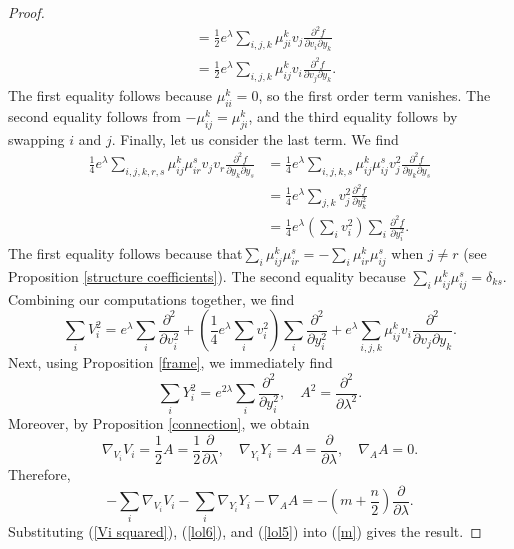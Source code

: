 \documentclass{amsart}
\theoremstyle{plain}
\theoremstyle{definition}
\theoremstyle{remark}
\begin{document}
\begin{proof}
\begin{align*}
			&= \frac12 e^\lambda \sum_{i,j,k} \mu_{ji}^k v_j \frac{\partial^2 f}{\partial v_i\partial y_k }  \\
			&=\frac12 e^\lambda \sum_{i,j,k} \mu_{ij}^k v_i\frac{\partial^2 f}{\partial v_j\partial y_k }.
		\end{align*}
		The first equality follows because $\mu_{ii}^k = 0$, so the first order term vanishes. The second equality follows from $-\mu_{ij}^k = \mu_{ji}^k$, and the third equality follows by swapping $i$ and $j$. Finally, let us consider the last term. We find 
		\begin{align*}
			\frac14 e^\lambda \sum_{i,j,k,r,s} \mu_{ij}^k \mu_{ir}^s v_j v_r \frac{\partial^2 f}{\partial y_k \partial y_s} &= \frac14 e^\lambda\sum_{i,j,k,s} \mu_{ij}^k \mu_{ij}^s v_j^2 \frac{\partial^2 f}{\partial y_k \partial y_s}  \\ 
			&= \frac14 e^\lambda\sum_{j,k} v_j^2 \frac{\partial^2 f}{\partial y_k^2} \\
			&= \frac14e^\lambda \left(\sum_i v_i^2\right) \sum_i \frac{\partial^2 f}{ \partial y_i ^2}.
		\end{align*}
		The first equality follows because  that$ \sum_i \mu_{ij}^k \mu_{ir}^s = - \sum_i \mu_{ir}^k \mu_{ij}^s$ when $j \neq r$ (see Proposition \ref{structure coefficients}). The second equality because $	\sum_i \mu_{ij}^k \mu_{ij}^s  = \delta_{ks}$. Combining our computations together, we find 
		\begin{equation}
			\label{Vi squared}
			\sum_i V_i^2  = e^\lambda \sum_i\frac{\partial^2 }{\partial v_i^2} + \left(\frac14e^\lambda\sum_i v_i^2\right) \sum_i \frac{\partial^2 }{ \partial y_i ^2} +  e^\lambda \sum_{i,j,k} \mu_{ij}^k v_i \frac{\partial^2 }{\partial v_j\partial y_k }.
		\end{equation}
		Next, using Proposition \ref{frame}, we immediately find 
		\begin{equation}
			\label{lol6}
			\sum_iY_i^2 = e^{2 \lambda} \sum_i \frac{\partial^2}{\partial y_i^2},  \quad A^2 = \frac{\partial^2}{\partial \lambda^2}.
		\end{equation}
		Moreover, by Proposition \ref{connection}, we obtain 
		$$
			\nabla_{V_i} V_i = \frac12 A = \frac12 \frac{\partial}{\partial \lambda}, \quad \nabla_{Y_i} Y_i = A = \frac{\partial}{\partial \lambda},\quad  \nabla_A A = 0.
		$$
		Therefore, 
		\begin{equation}
			\label{lol5}
			- \sum_i \nabla_{V_i}V_i- \sum_i \nabla_{Y_i}Y_i - \nabla_A A = -\left(m + \frac n2\right)\frac{\partial}{\partial \lambda}.
		\end{equation}
		Substituting  (\ref{Vi squared}), (\ref{lol6}), and (\ref{lol5}) into (\ref{m}) gives the result.
	\end{proof}
 
\end{document}
